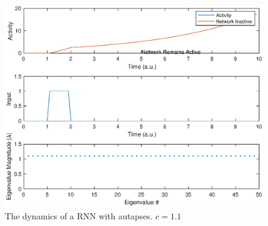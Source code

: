 \documentclass[11pt, oneside]{article}
\begin{document}
\begin{figure}[ht!]
\includegraphics[width=1\textwidth]{RNN11.eps}
\caption{The dynamics of a RNN with autapses. $c = 1.1$}
\label{fig:RNN11}
\end{figure}
\end{document}
